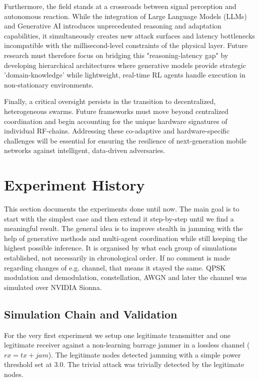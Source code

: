\documentclass[conference]{IEEEtran}
\newcommand{\adm}[1]{{\color{orange}{[#1]}}}
\newcommand{\rar}[1]{{\color{blue}{[#1]}}}
\begin{document}
Furthermore, the field stands at a crossroads between signal perception and autonomous reaction. While the integration of Large Language Models (LLMs) and Generative AI introduces unprecedented reasoning and adaptation capabilities, it simultaneously creates new attack surfaces and latency bottlenecks incompatible with the millisecond-level constraints of the physical layer. 
Future research must therefore focus on bridging this "reasoning-latency gap" by developing hierarchical architectures where generative models provide strategic 'domain-knowledge' while lightweight, real-time RL agents handle execution in non-stationary environments.

Finally, a critical oversight persists in the transition to decentralized, heterogeneous swarms.
Future frameworks must move beyond centralized coordination and begin accounting for the unique hardware signatures of individual RF-chains. \adm{yes, but not only}
Addressing these co-adaptive and hardware-specific challenges will be essential for ensuring the resilience of next-generation mobile networks against intelligent, data-driven adversaries.

\section{Experiment History}
This section documents the experiments done until now. The main goal is to start with the simplest case and then extend it step-by-step until we find a meaningful result. 
The general idea is to improve stealth in jamming with the help of generative methods and multi-agent coordination while still keeping the highest possible inference. 
It is organised by what each group of simulations established, not necessarily in chronological order. 
If no comment is made regarding changes of e.g. channel, that means it stayed  the same.
QPSK modulation and demodulation, constellation, AWGN and later the channel was simulated over NVIDIA Sionna. 

\subsection{Simulation Chain and Validation}
For the very first experiment we setup one legitimate transmitter and one legitimate receiver against a non-learning barrage jammer in a lossless channel ($rx = tx + jam$).
The legitimate nodes detected jamming with a simple power threshold set at 3.0.
The trivial attack was trivially detected by the legitimate nodes.
\end{document}
